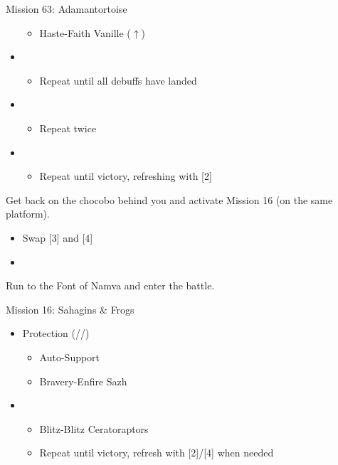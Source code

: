 \begin{battle}{Mission 63: Adamantortoise}
\begin{itemize}
\begin{itemize}
				\item Haste-Faith Vanille ($\uparrow$)
			\end{itemize}
		\item \third
			\begin{itemize}
				\item Repeat until all debuffs have landed
			\end{itemize}
		\item \fourth
			\begin{itemize}
				\item Repeat twice
			\end{itemize}
		\item \first
			\begin{itemize}
				\item Repeat until victory, refreshing with [2]
			\end{itemize}
	\end{itemize}
\end{battle}

Get back on the chocobo behind you and activate Mission 16 (on the same platform).

\begin{menu}
	\begin{itemize}
	\paradigm
		\begin{itemize}
			\item Swap [3] and [4]
			\item {}%
				{\paradigmline{\com}{\com}{\com}}%
				{\paradigmline{\com}{(\sen)}{(\med)}}%
				{\paradigmline{\com}{(\sen)}{(\med)}}%
				{\paradigmline[4]{(\syn)}{(\sen)}{(\med)}}%
				{\paradigmline{\syn}{\rav}{\sab}}%
				{\paradigmline{\rav}{\rav}{\sab}}%
		\end{itemize}
	\end{itemize}
\end{menu}

\renewcommand{\second}{[2] Solidarity (\com/\sen/\med)}
\renewcommand{\third}{[3] Solidarity (\com/\sen/\med)}
\renewcommand{\fourth}{[4] Protection (\syn/\sen/\med)}

Run to the Font of Namva and enter the battle.

\begin{battle}{Mission 16: Sahagins \& Frogs}
	\begin{itemize}
		\item \fourth
			\begin{itemize}
				\item Auto-Support
				\item Bravery-Enfire Sazh
			\end{itemize}
		\item \first
			\begin{itemize}
				\item Blitz-Blitz Ceratoraptors
				\item Repeat until victory, refresh with [2]/[4] when needed
			\end{itemize}
	\end{itemize}
\end{battle}

